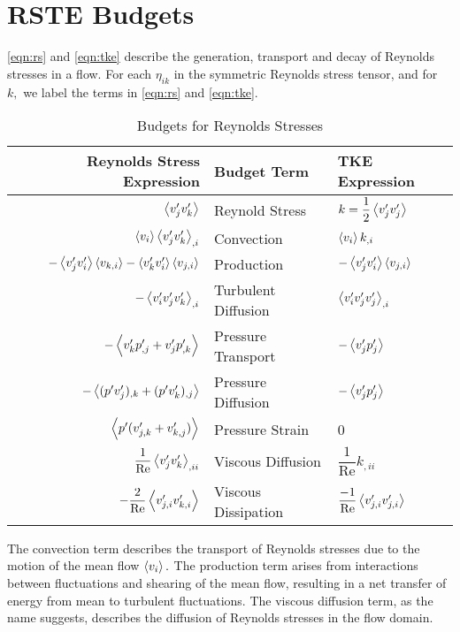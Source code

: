 \section{RSTE Budgets}
\autoref{eqn:rs} and \autoref{eqn:tke} describe the generation, transport and decay of Reynolds stresses in a flow. For each $\eta_{ik}$ in the symmetric Reynolds stress tensor, and for $k,$ we label the terms in \autoref{eqn:rs} and \autoref{eqn:tke}.
\begin {table}[H]
\centering  \caption{Budgets for Reynolds Stresses}
\label{tbl:rs-budgets}
\begin{tabular}{| r | l | l |}
\hline
\textbf{Reynolds Stress Expression} & \textbf{Budget Term} & \textbf{TKE Expression}\\
\hline
$\expval{v'_jv'_k}$                                                     & Reynold Stress      & $k=\dfrac{1}{2}\expval{v'_jv'_j}$               \\[0.5em]
$\expval{v_i}\expval{v'_jv'_k}_{,i}$                                    & Convection          & $\expval{v_i}k_{,i}$                            \\[0.5em]
$-\expval{v'_j v'_i}\expval{v_{k,i}}-\expval{v'_k v'_i}\expval{v_{j,i}}$& Production          & $-\expval{v'_jv'_i}\expval{v_{j,i}}$            \\[0.5em]
$-\expval{v'_i v'_j v'_k}_{,i}$                                         & Turbulent Diffusion & $\expval{v'_iv'_jv'_j}_{,i}$                    \\[0.5em]
$-\expval{v'_kp'_{,j} + v'_jp'_{,k}}$                                   & Pressure Transport  & $-\expval{v'_jp'_j}$                            \\[0.5em]
$-\expval{(p'v'_j)_{,k} + (p'v'_k)_{,j}}$                               & Pressure Diffusion  & $-\expval{v'_jp'_j}$                            \\[0.5em]
$\expval{p'(v'_{j,k}+v'_{k,j})}$                                        & Pressure Strain     & 0                                               \\[0.5em]
$\dfrac{1}{\text{Re}}\expval{v'_j v'_k}_{,ii}$                          & Viscous Diffusion   & $\dfrac{1}{\text{Re}}k_{,ii}$                   \\[0.5em]
$- \dfrac{2}{\text{Re}}\expval{v'_{j,i}v'_{k,i}}$                       & Viscous Dissipation & $\dfrac{-1}{\text{Re}}\expval{v'_{j,i}v'_{j,i}}$\\[0.5em]
\hline
\end{tabular}	
\end{table}

The convection term describes the transport of Reynolds stresses due to the motion of the mean flow $\expval{v_i}.$ The production term arises from interactions between fluctuations and shearing of the mean flow, resulting in a net transfer of energy from mean to turbulent fluctuations. The viscous diffusion term, as the name suggests, describes the diffusion of Reynolds stresses in the flow domain.
